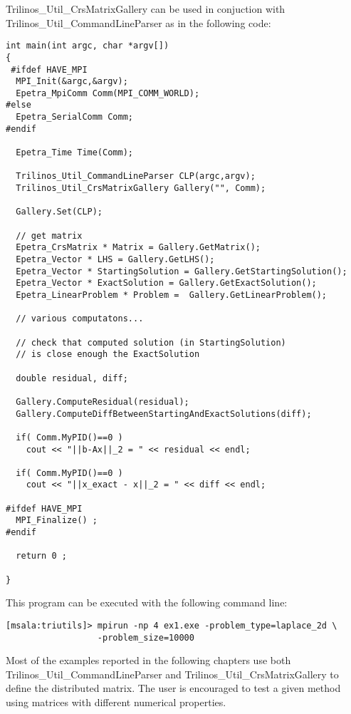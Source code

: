 Trilinos\_Util\_CrsMatrixGallery can be used in conjuction with
Trilinos\_Util\_CommandLineParser as in the following code:
\begin{verbatim}
int main(int argc, char *argv[]) 
{
 #ifdef HAVE_MPI
  MPI_Init(&argc,&argv);
  Epetra_MpiComm Comm(MPI_COMM_WORLD);
#else
  Epetra_SerialComm Comm;
#endif

  Epetra_Time Time(Comm);

  Trilinos_Util_CommandLineParser CLP(argc,argv);
  Trilinos_Util_CrsMatrixGallery Gallery("", Comm);

  Gallery.Set(CLP);

  // get matrix
  Epetra_CrsMatrix * Matrix = Gallery.GetMatrix();
  Epetra_Vector * LHS = Gallery.GetLHS();
  Epetra_Vector * StartingSolution = Gallery.GetStartingSolution();
  Epetra_Vector * ExactSolution = Gallery.GetExactSolution();
  Epetra_LinearProblem * Problem =  Gallery.GetLinearProblem();

  // various computatons...

  // check that computed solution (in StartingSolution) 
  // is close enough the ExactSolution

  double residual, diff;

  Gallery.ComputeResidual(residual);
  Gallery.ComputeDiffBetweenStartingAndExactSolutions(diff);
  
  if( Comm.MyPID()==0 ) 
    cout << "||b-Ax||_2 = " << residual << endl;

  if( Comm.MyPID()==0 ) 
    cout << "||x_exact - x||_2 = " << diff << endl;

#ifdef HAVE_MPI
  MPI_Finalize() ;
#endif

  return 0 ;

}
\end{verbatim}
This program can be executed with the following command line:
\begin{verbatim}
[msala:triutils]> mpirun -np 4 ex1.exe -problem_type=laplace_2d \
                  -problem_size=10000
\end{verbatim}

\begin{remark}
  Most of the examples reported in the following chapters use both
  Trilinos\_Util\_CommandLineParser and Trilinos\_Util\_CrsMatrixGallery
  to define the distributed matrix. The user is encouraged to test a
  given method using matrices with different numerical properties.
\end{remark}

